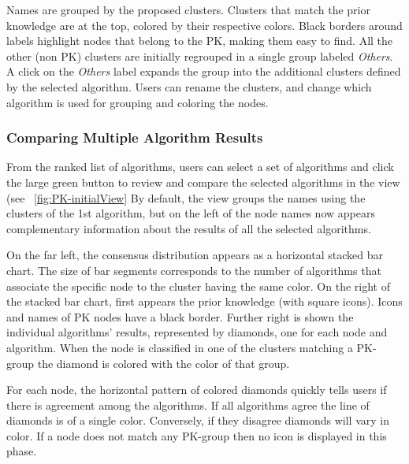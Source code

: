
Names are grouped by the proposed clusters. Clusters that match the prior knowledge are at the top, colored by their respective colors.  Black borders around labels highlight nodes that belong to the PK, making them easy to find. All the other (non PK) clusters are initially regrouped in a single group labeled \textit{Others}.
A click on the \textit{Others} label expands the group into the additional clusters defined by the selected algorithm.
Users can rename the clusters, and change which algorithm is used for grouping and coloring the nodes.

\subsubsection{Comparing Multiple Algorithm Results}

From the ranked list of algorithms, users can select a set of algorithms and click the large green button to review and compare the selected algorithms in the \paovis view (see ~\autoref{fig:PK-initialView}
By default, the \paovis view groups the names using the clusters of the 1st algorithm, but on the left of the node names now appears complementary information about the results of all the selected algorithms.

On the far left, the consensus distribution appears as a horizontal stacked bar chart. The size of bar segments corresponds to the number of algorithms that associate the specific node to the cluster having the same color. On the right of the stacked bar chart, first appears the prior knowledge (with square icons). Icons and names of PK nodes have a black border. Further right is shown the individual algorithms' results, represented by diamonds, one for each node and algorithm. When the node is classified in one of the clusters matching a PK-group the diamond is colored with the color of that group.


For each node, the horizontal pattern of colored diamonds quickly tells users if there is agreement among the algorithms. If all algorithms agree the line of diamonds is of a single color. Conversely, if they disagree diamonds will vary in color. If a node does not match any PK-group then no icon is displayed in this phase.

